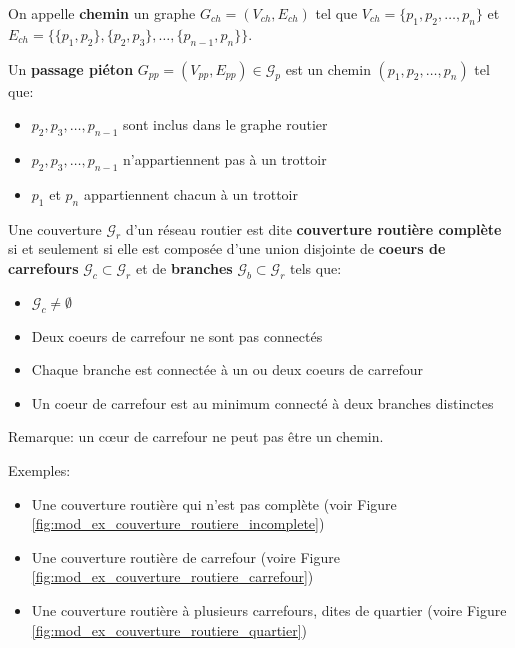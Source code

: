 \begin{definition}
    On appelle \textbf{chemin} un graphe $G_{ch} = (V_{ch}, E_{ch})$ tel que $V_{ch}=\{p_1,p_2,\dots,p_n\}$ et $E_{ch}=\{\{p_1,p_2\},\{p_2,p_3\},\dots,\{p_{n-1},p_n\}\}$.
\end{definition}

\begin{definition}
    Un \textbf{passage piéton} $G_{pp} = (V_{pp}, E_{pp}) \in \mathcal{G}_p$ est un chemin $(p_1, p_2,\dots, p_n)$ tel que:

    \begin{itemize}
        \item $p_2, p_3, \dots, p_{n-1}$ sont inclus dans le graphe routier
        \item $p_2, p_3, \dots, p_{n-1}$ n'appartiennent pas à un trottoir
        \item $p_1$ et $p_n$ appartiennent chacun à un trottoir
    \end{itemize}
\end{definition}

\begin{definition}
    Une couverture $\mathcal{G}_r$ d'un réseau routier est dite \textbf{couverture routière complète} si et seulement si elle est composée d'une union disjointe de \textbf{coeurs de carrefours} $\mathcal{G}_c \subset \mathcal{G}_r$ et de \textbf{branches} $\mathcal{G}_b \subset \mathcal{G}_r$ tels que:

    \begin{itemize}
        \item $\mathcal{G}_c \neq \emptyset$ 
        \item Deux coeurs de carrefour ne sont pas connectés
        \item Chaque branche est connectée à un ou deux coeurs de carrefour
        \item Un coeur de carrefour est au minimum connecté à deux branches distinctes
    \end{itemize}
    \label{def:modelisation_couverture_routiere_complète}
\end{definition}

\noindent
Remarque: un cœur de carrefour ne peut pas être un chemin.

\noindent
Exemples:
\begin{itemize}
    \item Une couverture routière qui n'est pas complète (voir Figure \ref{fig:mod_ex_couverture_routiere_incomplete})
    \item Une couverture routière de carrefour (voire Figure \ref{fig:mod_ex_couverture_routiere_carrefour})
    \item Une couverture routière à plusieurs carrefours, dites de quartier (voire Figure \ref{fig:mod_ex_couverture_routiere_quartier})
\end{itemize}

